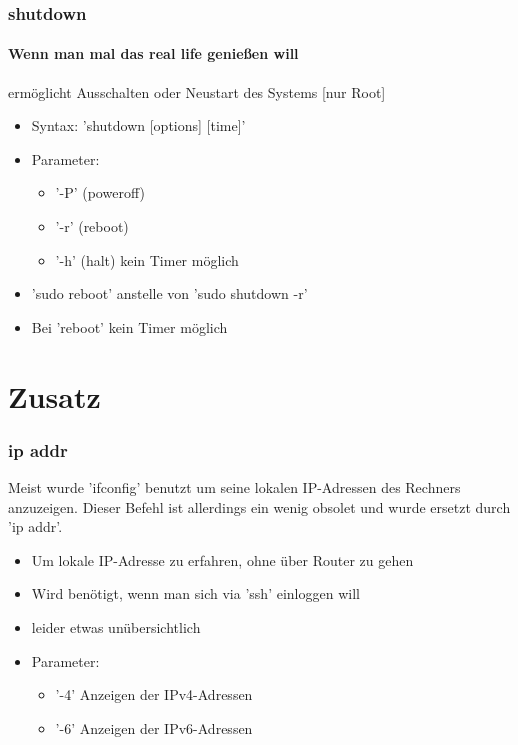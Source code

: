 \documentclass[12pt,utf8]{beamer}
\begin{document}
\begin{frame}
\frametitle{shutdown}
\framesubtitle{\textcolor{ownDarkOr}{Wenn man mal das real life genießen will}}
ermöglicht Ausschalten oder Neustart des Systems [nur Root]
\begin{itemize}[<+->]
	\item Syntax: 'shutdown [options] [time]'
	\item Parameter:
	\begin{itemize}[<+->]
		\item '-P' (poweroff)
		\item '-r' (reboot) 
		\item '-h' (halt) kein Timer möglich
	\end{itemize}
	\item 'sudo reboot' anstelle von 'sudo shutdown -r'
	\item Bei 'reboot' kein Timer möglich
\end{itemize}
\end{frame}

\section{Zusatz}
\begin{frame}
\frametitle{ip addr}
Meist wurde 'ifconfig' benutzt um seine lokalen IP-Adressen des Rechners anzuzeigen. Dieser Befehl ist allerdings ein wenig obsolet und wurde ersetzt durch 'ip addr'.
\begin{itemize}
	\item Um lokale IP-Adresse zu erfahren, ohne über Router zu gehen
	\item Wird benötigt, wenn man sich via 'ssh' einloggen will
	\item leider etwas unübersichtlich
	\item Parameter:
	\begin{itemize}
		\item '-4' Anzeigen der IPv4-Adressen
		\item '-6' Anzeigen der IPv6-Adressen
	\end{itemize}
\end{itemize}
\end{frame}
\end{document}
